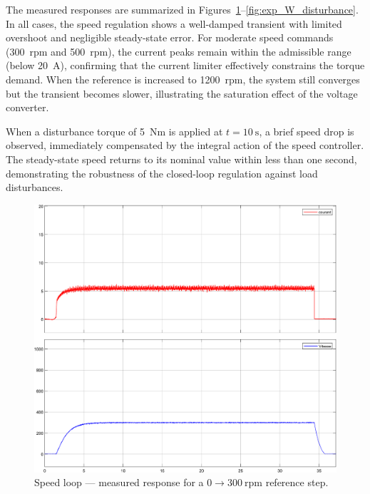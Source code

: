 \documentclass{rapportCS}
\begin{document}
The measured responses are summarized in Figures~\ref{fig:exp_W_300}--\ref{fig:exp_W_disturbance}. 
In all cases, the speed regulation shows a well-damped transient with limited overshoot and negligible steady-state error. 
For moderate speed commands (300~rpm and 500~rpm), the current peaks remain within the admissible range (below 20~A), confirming that the current limiter effectively constrains the torque demand. 
When the reference is increased to 1200~rpm, the system still converges but the transient becomes slower, illustrating the saturation effect of the voltage converter.

When a disturbance torque of 5~Nm is applied at $t=10~\text{s}$, a brief speed drop is observed, immediately compensated by the integral action of the speed controller. 
The steady-state speed returns to its nominal value within less than one second, demonstrating the robustness of the closed-loop regulation against load disturbances.

\begin{figure}[H]
    \centering
    \includegraphics[width=\linewidth, keepaspectratio]{figures/p300.png}
    \caption{Speed loop --- measured response for a $0 \rightarrow 300~\text{rpm}$ reference step.}
    \label{fig:exp_W_300}
\end{figure}
\end{document}
